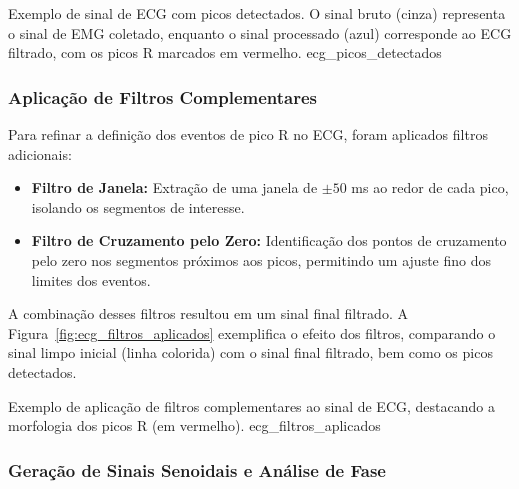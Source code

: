 {Exemplo de sinal de ECG com picos detectados. O sinal bruto (cinza) representa o sinal de EMG coletado, enquanto o sinal processado (azul) corresponde ao ECG filtrado, com os picos R marcados em vermelho.}
{ecg_picos_detectados}


\subsubsection{Aplicação de Filtros Complementares}
Para refinar a definição dos eventos de pico R no ECG, foram aplicados filtros adicionais:
\begin{itemize}
    \item \textbf{Filtro de Janela:} Extração de uma janela de \(\pm50\) ms ao redor de cada pico, isolando os segmentos de interesse.
    \item \textbf{Filtro de Cruzamento pelo Zero:} Identificação dos pontos de cruzamento pelo zero nos segmentos próximos aos picos, permitindo um ajuste fino dos limites dos eventos.
\end{itemize}

A combinação desses filtros resultou em um sinal final filtrado. A Figura~\ref{fig:ecg_filtros_aplicados} exemplifica o efeito dos filtros, comparando o sinal limpo inicial (linha colorida) com o sinal final filtrado, bem como os picos detectados.

{Exemplo de aplicação de filtros complementares ao sinal de ECG, destacando a morfologia dos picos R (em vermelho).}
{ecg_filtros_aplicados}


\subsubsection{Geração de Sinais Senoidais e Análise de Fase}

